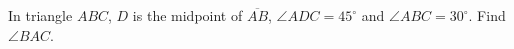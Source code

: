 In triangle $ABC$, $D$ is the midpoint of $\overline{AB}$, $\angle ADC=45^\circ$ and $\angle ABC=30^\circ$. Find $\angle BAC$.
